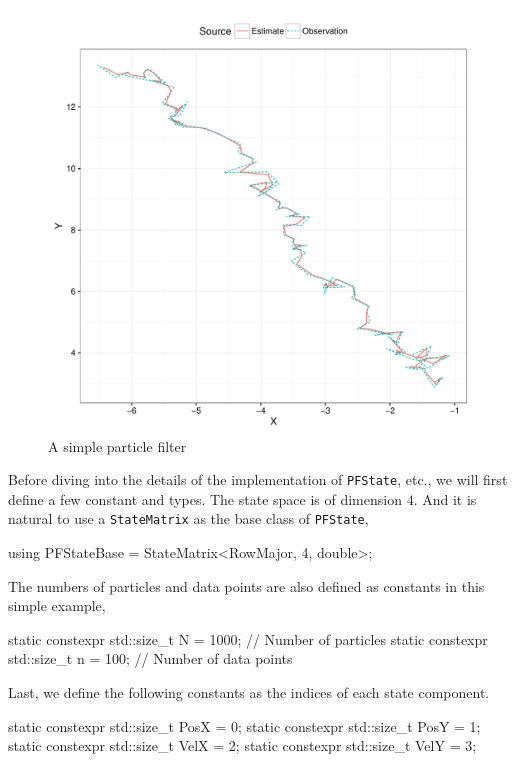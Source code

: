 \begin{figure}
  \includegraphics[width=\linewidth]{cpp/pf}
  \caption{A simple particle filter}
  \label{fig:pf}
\end{figure}

Before diving into the details of the implementation of \verb|PFState|, etc.,
we will first define a few constant and types. The state space is of dimension
$4$. And it is natural to use a \verb|StateMatrix| as the base class of
\verb|PFState|,
\begin{cppcode}
  using PFStateBase = StateMatrix<RowMajor, 4, double>;
\end{cppcode}
The numbers of particles and data points are also defined as constants in this
simple example,
\begin{cppcode}
  static constexpr std::size_t N = 1000; // Number of particles
  static constexpr std::size_t n = 100;  // Number of data points
\end{cppcode}
Last, we define the following constants as the indices of each state component.
\begin{cppcode}
  static constexpr std::size_t PosX = 0;
  static constexpr std::size_t PosY = 1;
  static constexpr std::size_t VelX = 2;
  static constexpr std::size_t VelY = 3;
\end{cppcode}

